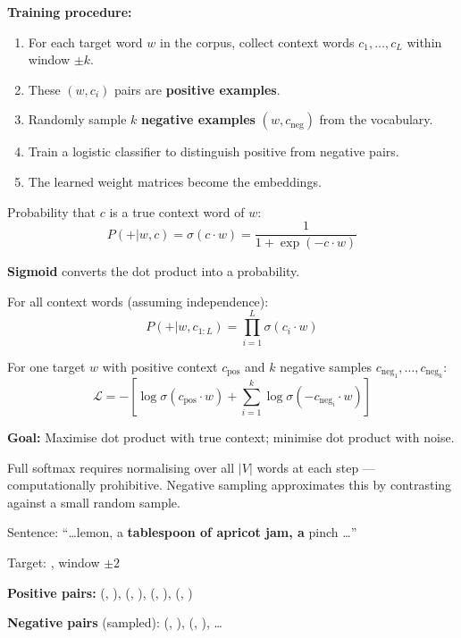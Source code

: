 \textbf{Training procedure:}
\begin{enumerate}
  \item For each target word $w$ in the corpus, collect context words $c_1, \ldots, c_L$ within window $\pm k$.
  \item These $(w, c_i)$ pairs are \textbf{positive examples}.
  \item Randomly sample $k$ \textbf{negative examples} $(w, c_{\text{neg}})$ from the vocabulary.
  \item Train a logistic classifier to distinguish positive from negative pairs.
  \item The learned weight matrices become the embeddings.
\end{enumerate}

\begin{defbox}
Probability that $c$ is a true context word of $w$:
\[
P(+|w, c) = \sigma(c \cdot w) = \frac{1}{1 + \exp(-c \cdot w)}
\]

\textbf{Sigmoid} converts the dot product into a probability.

For all context words (assuming independence):
\[
P(+|w, c_{1:L}) = \prod_{i=1}^{L} \sigma(c_i \cdot w)
\]
\end{defbox}

\begin{defbox}
For one target $w$ with positive context $c_{\text{pos}}$ and $k$ negative samples $c_{\text{neg}_1}, \ldots, c_{\text{neg}_k}$:
\[
\mathcal{L} = -\left[ \log \sigma(c_{\text{pos}} \cdot w) + \sum_{i=1}^{k} \log \sigma(-c_{\text{neg}_i} \cdot w) \right]
\]

\textbf{Goal:} Maximise dot product with true context; minimise dot product with noise.
\end{defbox}

\begin{tipbox}
Full softmax requires normalising over all $|V|$ words at each step --- computationally prohibitive. Negative sampling approximates this by contrasting against a small random sample.
\end{tipbox}

\begin{exbox}
Sentence: ``\ldots lemon, a \textbf{tablespoon of apricot jam, a} pinch \ldots''

Target: , window $\pm 2$

\textbf{Positive pairs:} (, ), (, ), (, ), (, )

\textbf{Negative pairs} (sampled): (, ), (, ), \ldots
\end{exbox}

